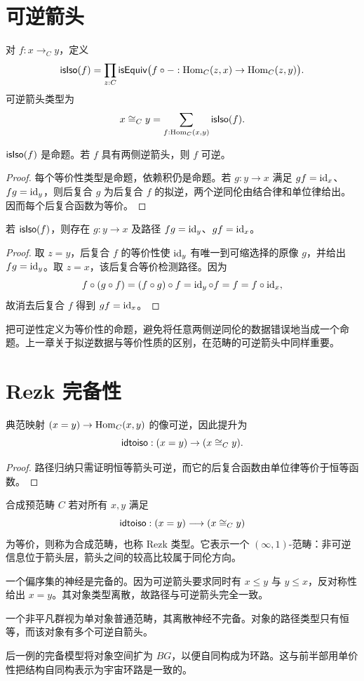 \section{可逆箭头}
\begin{definition}[可逆性]
对 $f:x\to_Cy$，定义
\[
\mathsf{isIso}(f)=\prod_{z:C}\mathsf{isEquiv}
\bigl(f\circ-:\operatorname{Hom}_C(z,x)\to\operatorname{Hom}_C(z,y)\bigr).
\]
可逆箭头类型为
\[
x\cong_Cy=\sum_{f:\operatorname{Hom}_C(x,y)}\mathsf{isIso}(f).
\]
\end{definition}
\begin{proposition}
$\mathsf{isIso}(f)$ 是命题。若 $f$ 具有两侧逆箭头，则 $f$ 可逆。
\end{proposition}
\begin{proof}
每个等价性类型是命题，依赖积仍是命题。若 $g:y\to x$ 满足 $gf=\operatorname{id}_x$、$fg=\operatorname{id}_y$，则后复合 $g$ 为后复合 $f$ 的拟逆，两个逆同伦由结合律和单位律给出。因而每个后复合函数为等价。
\end{proof}
\begin{proposition}[可逆性给出两侧逆]
若 $\mathsf{isIso}(f)$，则存在 $g:y\to x$ 及路径 $fg=\operatorname{id}_y$、$gf=\operatorname{id}_x$。
\end{proposition}
\begin{proof}
取 $z=y$，后复合 $f$ 的等价性使 $\operatorname{id}_y$ 有唯一到可缩选择的原像 $g$，并给出 $fg=\operatorname{id}_y$。取 $z=x$，该后复合等价检测路径。因为
\[
f\circ(g\circ f)=(f\circ g)\circ f
=\operatorname{id}_y\circ f=f=f\circ\operatorname{id}_x,
\]
故消去后复合 $f$ 得到 $gf=\operatorname{id}_x$。
\end{proof}
\begin{remark}
把可逆性定义为等价性的命题，避免将任意两侧逆同伦的数据错误地当成一个命题。上一章关于拟逆数据与等价性质的区别，在范畴的可逆箭头中同样重要。
\end{remark}

\section{Rezk 完备性}
\begin{proposition}[路径给出可逆箭头]
典范映射 $(x=y)\to\operatorname{Hom}_C(x,y)$ 的像可逆，因此提升为
\[
\mathsf{idtoiso}:(x=y)\to(x\cong_Cy).
\]
\end{proposition}
\begin{proof}
路径归纳只需证明恒等箭头可逆，而它的后复合函数由单位律等价于恒等函数。
\end{proof}
\begin{definition}[合成范畴]\label{def:rezk}
合成预范畴 $C$ 若对所有 $x,y$ 满足
\[
\mathsf{idtoiso}:(x=y)\longrightarrow(x\cong_Cy)
\]
为等价，则称为合成范畴，也称 Rezk 类型。它表示一个 $(\infty,1)$-范畴：非可逆信息位于箭头层，箭头之间的较高比较属于同伦方向。
\end{definition}
\begin{example}
一个偏序集的神经是完备的。因为可逆箭头要求同时有 $x\le y$ 与 $y\le x$，反对称性给出 $x=y$。其对象类型离散，故路径与可逆箭头完全一致。

一个非平凡群视为单对象普通范畴，其离散神经不完备。对象的路径类型只有恒等，而该对象有多个可逆自箭头。
\end{example}
\begin{remark}
后一例的完备模型将对象空间扩为 $BG$，以便自同构成为环路。这与前半部用单价性把结构自同构表示为宇宙环路是一致的。
\end{remark}

